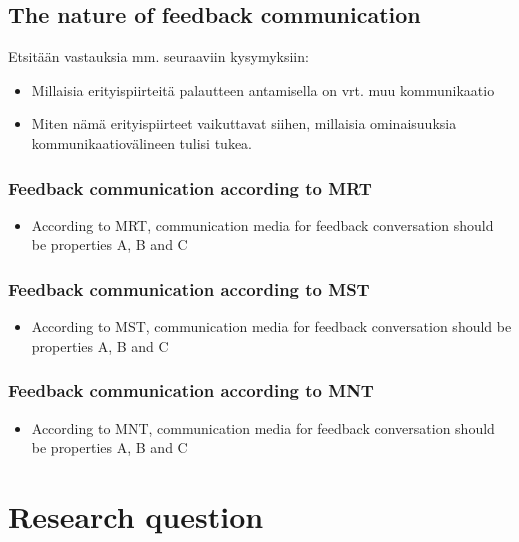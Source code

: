\documentclass[english,12pt,a4paper,pdftex]{article}
\begin{document}
\subsection{The nature of feedback communication}

Etsitään vastauksia mm. seuraaviin kysymyksiin:

\begin{itemize}
\item Millaisia erityispiirteitä palautteen antamisella on vrt. muu kommunikaatio
\item Miten nämä erityispiirteet vaikuttavat siihen, millaisia ominaisuuksia kommunikaatiovälineen tulisi tukea.
\end{itemize}

\subsubsection{Feedback communication according to MRT}

\begin{itemize}
\item According to MRT, communication media for feedback conversation should be properties A, B and C
\end{itemize}

\subsubsection{Feedback communication according to MST}

\begin{itemize}
\item According to MST, communication media for feedback conversation should be properties A, B and C
\end{itemize}

\subsubsection{Feedback communication according to MNT}

\begin{itemize}
\item According to MNT, communication media for feedback conversation should be properties A, B and C
\end{itemize}

\clearpage

\section{Research question}
\end{document}
